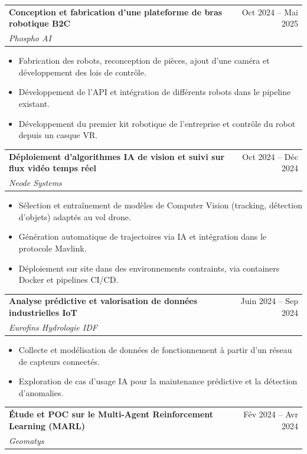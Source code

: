 \documentclass[letterpaper,11pt]{article}
\makeatletter
\newcommand{\resumeItem}[1]{
  \item\small{
    {#1 \vspace{-7pt}}
  }
}
\newcommand{\resumeSubheading}[4]{
  \vspace{-3pt}\item
    \begin{tabular*}{0.97\textwidth}[t]{l@{\extracolsep{\fill}}r}
      \textbf{#1} & #2 \\
      \textit{\small#3} & \textit{\small #4} \\
    \end{tabular*}\vspace{-7pt}
}
\newcommand{\resumeItemListStart}{\begin{itemize}}
\newcommand{\resumeItemListEnd}{\end{itemize}\vspace{-3pt}}
\makeatother
\begin{document}
\resumeSubheading
  {Conception et fabrication d'une plateforme de bras robotique B2C}{Oct 2024 -- Mai 2025}{Phospho AI}{}
  
  \resumeItemListStart
    \resumeItem{Fabrication des robots, reconception de pièces, ajout d'une caméra et développement des lois de contrôle.}
    \vspace{4pt}
    \resumeItem{Développement de l'API et intégration de différents robots dans le pipeline existant.}
    \vspace{4pt}
    \resumeItem{Développement du premier kit robotique de l'entreprise et contrôle du robot depuis un casque VR.}
  \resumeItemListEnd
  \vspace{6pt}


\resumeSubheading
  {Déploiement d’algorithmes IA de vision et suivi sur flux vidéo temps réel}{Oct 2024 -- Déc 2024}{Neode Systems}{}
  
  \resumeItemListStart
    \resumeItem{Sélection et entraînement de modèles de Computer Vision (tracking, détection d’objets) adaptés au vol drone.}
    \vspace{4pt}
    \resumeItem{Génération automatique de trajectoires via IA et intégration dans le protocole Mavlink.}
    \vspace{4pt}
    \resumeItem{Déploiement sur site dans des environnements contraints, via containers Docker et pipelines CI/CD.}
  \resumeItemListEnd
  \vspace{6pt}


\resumeSubheading
  {Analyse prédictive et valorisation de données industrielles IoT}{Juin 2024 -- Sep 2024}{Eurofins Hydrologie IDF}{}
  
  \resumeItemListStart
    \resumeItem{Collecte et modélisation de données de fonctionnement à partir d’un réseau de capteurs connectés.}
    \vspace{4pt}
    \resumeItem{Exploration de cas d’usage IA pour la maintenance prédictive et la détection d’anomalies.}
  \resumeItemListEnd
  \vspace{6pt}

\resumeSubheading
  {Étude et POC sur le Multi-Agent Reinforcement Learning (MARL)}{Fév 2024 -- Avr 2024}{Geomatys}{}
  
\end{document}
